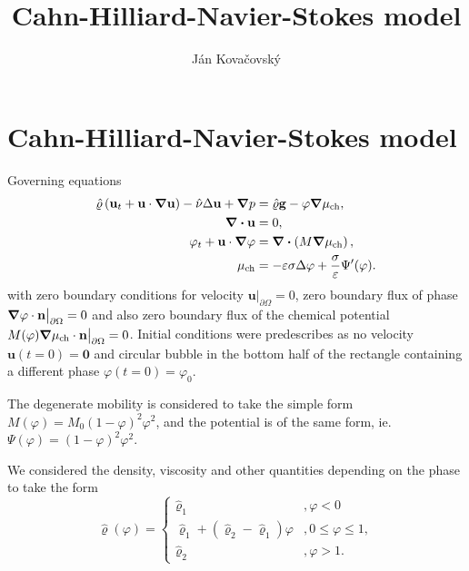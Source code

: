 \documentclass{article} %
\title{Cahn-Hilliard-Navier-Stokes model}
\author{Ján Kovačovský}
\newcommand{\velocity}{\mathbf{u}}
\newcommand{\pressure}{p}
\newcommand{\phase}{\varphi}
\newcommand{\chempot}{\mu_{\text{ch}}}
\newcommand{\density}{\hat{\varrho}}
\newcommand{\viscosity}{\hat{\nu}}
\newcommand{\mobility}{M}
\newcommand{\gravity}{\mathbf{g}}
\newcommand{\potential}{\Psi}
\begin{document}
\section*{Cahn-Hilliard-Navier-Stokes model}

Governing equations
\begin{align*}
    \density \left(\velocity_t + \velocity \cdot \grad{\velocity}\right) - \viscosity \Delta{\velocity} + \grad{\pressure} &= \density \gravity - \phase \grad{\chempot}, \\
    \div{\velocity} &= 0, \\
    \phase_t + \velocity \cdot \grad{\phase} &= \div{\left(\mobility \grad{\chempot}\right)}, \\
    \chempot &= -\varepsilon \sigma \Delta \phase + \frac{\sigma}{\varepsilon} \potential'(\phase).
\end{align*}
with zero boundary conditions for velocity $\velocity\big|_{\partial \Omega} = 0$, zero boundary flux of phase $\grad{\phase} \cdot \mathbf{n} \big|_{\partial \Omega}= 0$ and also zero boundary flux of the chemical potential $\mobility(\phase) \grad{\chempot} \cdot \mathbf{n} \big|_{\partial \Omega} = 0$. Initial conditions were predescribes as no velocity $\velocity(t = 0) = \mathbf{0}$ and circular bubble in the bottom half of the rectangle containing a different phase $\phase(t = 0) = \phase_0$.

The degenerate mobility is considered to take the simple form $M(\phase) = M_0 \left(1 - \phase\right)^2 \phase^2$, and the potential is of the same form, ie. $\potential(\phase) = \left(1 - \phase\right)^2 \phase^2$.

We considered the density, viscosity and other quantities depending on the phase to take the form
\begin{equation*}
    \density(\phase) = \begin{cases} 
        \density_1 &, \phase < 0 \\
        \density_1 + (\density_2 - \density_1) \phase &, 0 \leq \phase \leq 1, \\
        \density_2 &, \phase > 1.
                \end{cases}
\end{equation*}
\end{document}
